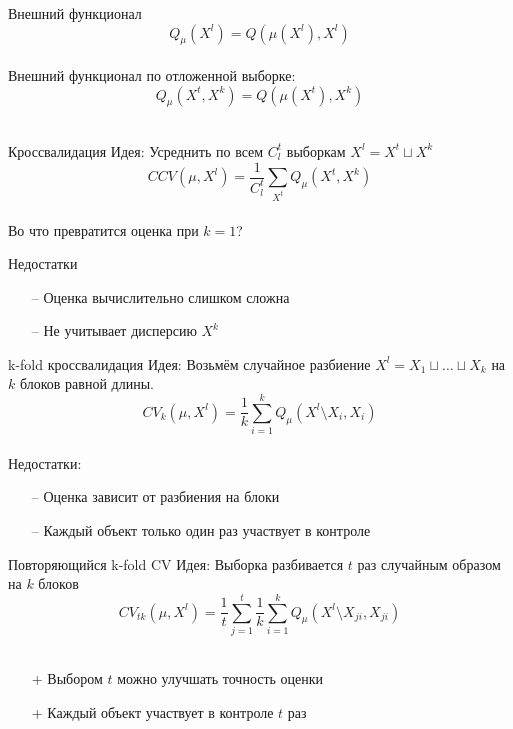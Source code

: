 \documentclass[10pt]{beamer}
\begin{document}
\begin{frame}{Внешний функционал}  
  $$Q_{\mu}(X^l) = Q(\mu(X^l), X^l)$$\\
  \bigbreak
  Внешний функционал по отложенной выборке:\\
  $$Q_{\mu}(X^t, X^k) = Q(\mu(X^t), X^k)$$\\
  \bigbreak
\end{frame}

{
\begin{frame}{Кроссвалидация}  
  \alert{Идея}: Усреднить по всем $C_l^t$ выборкам $X^l = X^t \sqcup X^k$\\
  $$CCV(\mu, X^l) = \frac{1}{C_l^t} \sum\limits_{X^t} Q_{\mu}(X^t, X^k)$$\\
  \bigbreak
  Во что превратится оценка при $k=1$?
\end{frame}
}

\begin{frame}{Недостатки}  
  \begin{enumerate}
    \item[--] Оценка вычислительно слишком сложна
    \item[--] Не учитывает дисперсию $X^k$
  \end{enumerate}
\end{frame}

\begin{frame}{k-fold кроссвалидация}  
  \alert{Идея}: Возьмём случайное разбиение $X^l = X_1 \sqcup \dots \sqcup X_k$ на $k$ блоков равной длины.\\
  $$CV_k(\mu, X^l) = \frac{1}{k} \sum\limits_{i=1}^{k} Q_{\mu}(X^l \setminus X_i, X_i)$$\\
  \bigbreak
  \pause
  Недостатки:  
  \begin{enumerate}
    \item[--] Оценка зависит от разбиения на блоки
    \item[--] Каждый объект только один раз участвует в контроле    
  \end{enumerate}
\end{frame}

{
\begin{frame}{Повторяющийся k-fold CV}  
  \alert{Идея}: Выборка разбивается $t$ раз случайным образом на $k$ блоков\\
  
  $$CV_{tk}(\mu, X^l) = \frac{1}{t} \sum\limits_{j=1}^{t} \frac{1}{k} \sum\limits_{i=1}^{k} Q_{\mu}(X^l \setminus X_{ji}, X_{ji})$$\\
  \bigbreak
  \pause
  \begin{enumerate}
    \item[+] Выбором $t$ можно улучшать точность оценки
    \item[+] Каждый объект участвует в контроле $t$ раз
  \end{enumerate}
\end{frame}
}
\end{document}
